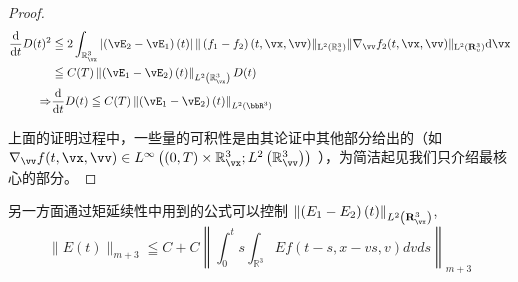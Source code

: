 \begin{proof}
\begin{equation}
  \label{eq:E-control-D}
\begin{aligned}
  \frac{\mathrm{d}}{\mathrm{d} t} D(t)^{2} & \leqq 2 \int_{\mathbb{R}_{\vx}^3 }\left|  \left(\vE_{2}-\vE_{1}\right) (t)\right|     \| \left(f_{1}-f_{2}\right)(t, \vx, \vv)\|_{\mathrm{L}^{2}(\mathbb{R}^3_{v})}   \| \nabla_{\vv} f_{2}(t, \vx, \vv) \|_{\mathrm{L}^{2}(\mathbf{R}^3_v)} \mathrm{d} \vx \\
  & \leqq C(T)\left\|\left(\vE_{1}-\vE_{2}\right)(t)\right\|_{L^{2}\left(\mathbb{R}_{\vx}^{3}\right)} D(t) \\
  \Rightarrow & \frac{\mathrm{d}}{\mathrm{d} t} D(t) \leqq C(T)\left\|\left(\vE_{1}-\vE_{2}\right)(t)\right\|_{L^{2}\left(\bbR^{3}\right)}
  \end{aligned}
\end{equation}


上面的证明过程中，一些量的可积性是由其论证中其他部分给出的（如 $\nabla_{\vv} f(t, \vx, \vv) \in L^{\infty}\left((0, T) \times \mathbb{R}_{\vx}^{3} ; L^{2}\left(\mathbb{R}_{\vv}^{3}\right)\right)$ ），为简洁起见我们只介绍最核心的部分。




\end{proof}

另一方面通过矩延续性中用到的公式可以控制 $\left\|\left(E_{1}-E_{2}\right)(t)\right\|_{L^{2}\left(\mathbf{R}_{\vx}^{3}\right)}$, 
$$\begin{equation}\|E(t)\|_{m+3} \leqq C+C\left\|\int_{0}^{t} s \int_{\mathbb{R}^{3}} E f(t-s, x-v s, v) d v d s\right\|_{m+3}\end{equation}$$

